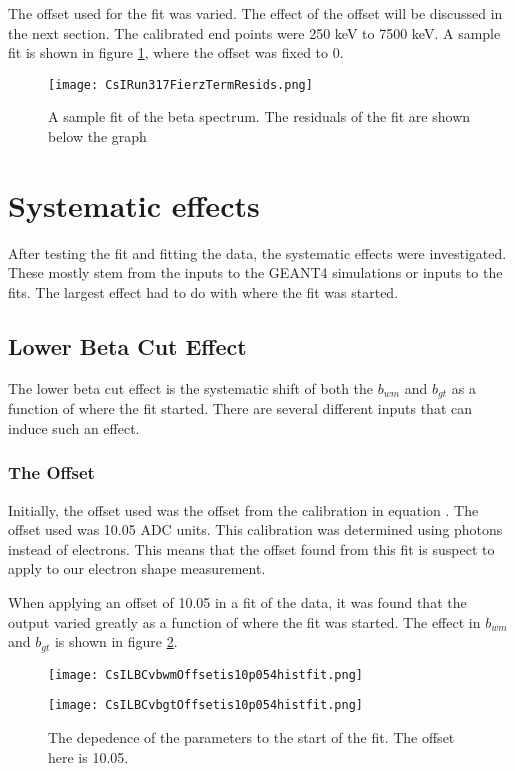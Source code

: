 \documentclass[main.tex]{subfiles}
\begin{document}
The offset used for the fit was varied.
The effect of the offset will be discussed in the next section. 
The calibrated end points were 250 keV to 7500 keV. 
A sample fit is shown in figure \ref{fig:samplefit}, where the offset was fixed to 0.

\begin{figure}[!htb]
	\centerline{\texttt{[image: CsIRun317FierzTermResids.png]}}
	\caption{A sample fit of the beta spectrum. 
		 The residuals of the fit are shown below the graph}
	\label{fig:samplefit}
\end{figure}

\section{Systematic effects}

After testing the fit and fitting the data, the systematic effects were investigated.
These mostly stem from the inputs to the GEANT4 simulations or inputs to the fits.
The largest effect had to do with where the fit was started.

\subsection{Lower Beta Cut Effect}

The lower beta cut effect is the systematic shift of both the $b_{wm}$ and $b_{gt}$ as a function of where the fit started.
There are several different inputs that can induce such an effect.

\subsubsection{The Offset}
Initially, the offset used was the offset from the calibration  in equation \label{eq:cal}.
The offset used was 10.05 ADC units.
This calibration was determined using photons instead of electrons.
This means that the offset found from this fit is suspect to apply to our electron shape measurement.

When applying an offset of 10.05 in a fit of the data, it was found that the output varied greatly as a function of where the fit was started.
The effect in $b_{wm}$ and $b_{gt}$ is shown in figure \ref{fig:offset10LBCeffect}.

\begin{figure}
    \centering
    \begin{minipage}{0.50\textwidth}
        \centerline{\texttt{[image: CsILBCvbwmOffsetis10p054histfit.png]}}
    \end{minipage}\hfill
    \begin{minipage}{0.50\textwidth}
        \centerline{\texttt{[image: CsILBCvbgtOffsetis10p054histfit.png]}}
    \end{minipage}
    \caption{The depedence of the parameters to the start of the fit.
	     The offset here is 10.05.}
    \label{fig:offset10LBCeffect}
\end{figure}
\end{document}
